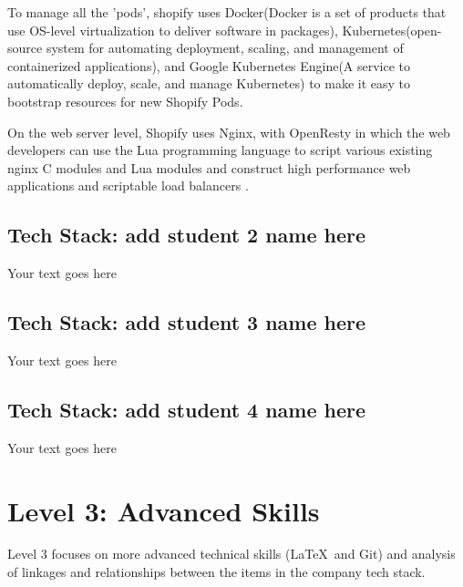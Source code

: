 \documentclass[a4paper, 11pt]{report}
\begin{document}
To manage all the 'pods', shopify uses Docker(Docker is a set of products that use OS-level virtualization to deliver software in packages), Kubernetes(open-source system for automating deployment, scaling, and management of containerized applications), and Google Kubernetes Engine(A service to automatically deploy, scale, and manage Kubernetes) to make it easy to bootstrap resources for new Shopify Pods.

On the web server level, Shopify uses Nginx, with OpenResty in which the web developers can use the Lua programming language to script various existing nginx C modules and Lua modules and construct high performance web applications and scriptable load balancers \cite{Shatrov2018}.

\subsection{Tech Stack: add student 2 name here}

Your text goes here

\subsection{Tech Stack: add student 3 name here}

Your text goes here

\subsection{Tech Stack: add student 4 name here}

Your text goes here



\newpage
\section{Level 3: Advanced Skills}

Level 3 focuses on more advanced technical skills (\LaTeX\ and Git) and analysis of linkages and relationships between the items in the company tech stack.
\end{document}
